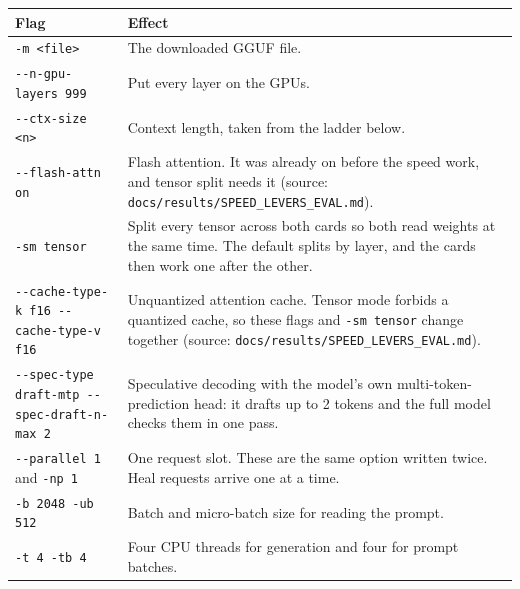 \begingroup\small
\begin{longtable}{>{\raggedright\arraybackslash}p{0.439\dimexpr\linewidth-4\tabcolsep\relax}>{\raggedright\arraybackslash}p{0.561\dimexpr\linewidth-4\tabcolsep\relax}}
\toprule
\rowcolor{gray!14}\textbf{Flag} & \textbf{Effect} \\
\midrule
\endhead
\bottomrule
\endfoot
\endlastfoot
\texttt{-\allowbreak{}m \textless{}file\textgreater{}} & The downloaded GGUF file. \\
\texttt{-\allowbreak{}-\allowbreak{}n-\allowbreak{}gpu-\allowbreak{}layers 999} & Put every layer on the GPUs. \\
\texttt{-\allowbreak{}-\allowbreak{}ctx-\allowbreak{}size \textless{}n\textgreater{}} & Context length, taken from the ladder below. \\
\texttt{-\allowbreak{}-\allowbreak{}flash-\allowbreak{}attn on} & Flash attention. It was already on before the speed work, and tensor split needs it (source: \texttt{docs/\allowbreak{}results/\allowbreak{}SPEED\_\allowbreak{}LEVERS\_\allowbreak{}EVAL.\allowbreak{}md}). \\
\texttt{-\allowbreak{}sm tensor} & Split every tensor across both cards so both read weights at the same time. The default splits by layer, and the cards then work one after the other. \\
\texttt{-\allowbreak{}-\allowbreak{}cache-\allowbreak{}type-\allowbreak{}k f16 -\allowbreak{}-\allowbreak{}cache-\allowbreak{}type-\allowbreak{}v f16} & Unquantized attention cache. Tensor mode forbids a quantized cache, so these flags and \texttt{-\allowbreak{}sm tensor} change together (source: \texttt{docs/\allowbreak{}results/\allowbreak{}SPEED\_\allowbreak{}LEVERS\_\allowbreak{}EVAL.\allowbreak{}md}). \\
\texttt{-\allowbreak{}-\allowbreak{}spec-\allowbreak{}type draft-\allowbreak{}mtp -\allowbreak{}-\allowbreak{}spec-\allowbreak{}draft-\allowbreak{}n-\allowbreak{}max 2} & Speculative decoding with the model's own multi-token-prediction head: it drafts up to 2 tokens and the full model checks them in one pass. \\
\texttt{-\allowbreak{}-\allowbreak{}parallel 1} and \texttt{-\allowbreak{}np 1} & One request slot. These are the same option written twice. Heal requests arrive one at a time. \\
\texttt{-\allowbreak{}b 2048 -\allowbreak{}ub 512} & Batch and micro-batch size for reading the prompt. \\
\texttt{-\allowbreak{}t 4 -\allowbreak{}tb 4} & Four CPU threads for generation and four for prompt batches. \\

\end{longtable}

